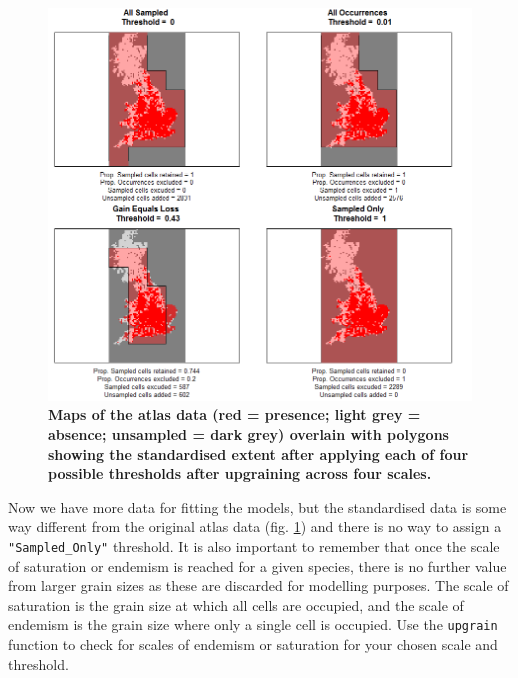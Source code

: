 \documentclass{article}[12pt, a4paper]
\begin{document}
\begin{figure}[ht]
\centering
\includegraphics[width=\linewidth]{Threshold_maps_4_scales.png}
\caption{\textbf{Maps of the atlas data (red = presence; light grey = absence; unsampled = dark grey) overlain with polygons showing the standardised extent after applying each of four possible thresholds after upgraining across four scales.}}
\label{fig:Threshold maps 4}
\end{figure}

Now we have more data for fitting the models, but the standardised data is some way different from the original atlas data (fig. \ref{fig:Threshold maps 4}) and there is no way to assign a \texttt{"Sampled\_Only"} threshold. It is also important to remember that once the scale of saturation or endemism is reached for a given species, there is no further value from larger grain sizes as these are discarded for modelling purposes. The scale of saturation is the grain size at which all cells are occupied, and the scale of endemism is the grain size where only a single cell is occupied. Use the \texttt{upgrain} function to check for scales of endemism or saturation for your chosen scale and threshold. 
\end{document}
